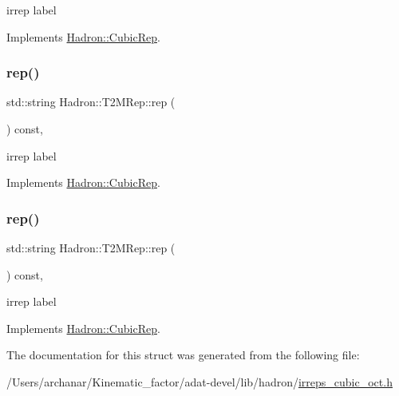 irrep label 

Implements \mbox{\hyperlink{structHadron_1_1CubicRep_ac3eb63608803d44c68681f158e14eb1b}{Hadron\+::\+Cubic\+Rep}}.

\mbox{\label{structHadron_1_1T2MRep_aa55b94a93f3336ef06369b8e2d544160}} 
\subsubsection{\texorpdfstring{rep()}{rep()}\hspace{0.1cm}{\footnotesize\ttfamily [2/3]}}
{\footnotesize\ttfamily std\+::string Hadron\+::\+T2\+M\+Rep\+::rep (\begin{DoxyParamCaption}{ }\end{DoxyParamCaption}) const\hspace{0.3cm}{\ttfamily [inline]}, {\ttfamily [virtual]}}

irrep label 

Implements \mbox{\hyperlink{structHadron_1_1CubicRep_ac3eb63608803d44c68681f158e14eb1b}{Hadron\+::\+Cubic\+Rep}}.

\mbox{\label{structHadron_1_1T2MRep_aa55b94a93f3336ef06369b8e2d544160}} 
\subsubsection{\texorpdfstring{rep()}{rep()}\hspace{0.1cm}{\footnotesize\ttfamily [3/3]}}
{\footnotesize\ttfamily std\+::string Hadron\+::\+T2\+M\+Rep\+::rep (\begin{DoxyParamCaption}{ }\end{DoxyParamCaption}) const\hspace{0.3cm}{\ttfamily [inline]}, {\ttfamily [virtual]}}

irrep label 

Implements \mbox{\hyperlink{structHadron_1_1CubicRep_ac3eb63608803d44c68681f158e14eb1b}{Hadron\+::\+Cubic\+Rep}}.



The documentation for this struct was generated from the following file\+:\begin{DoxyCompactItemize}
\item 
/\+Users/archanar/\+Kinematic\+\_\+factor/adat-\/devel/lib/hadron/\mbox{\hyperlink{adat-devel_2lib_2hadron_2irreps__cubic__oct_8h}{irreps\+\_\+cubic\+\_\+oct.\+h}}\end{DoxyCompactItemize}
